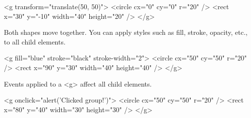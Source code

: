 \documentclass{report}
\begin{document}
\begin{itemize}
            \bigbreak \noindent 
            \begin{htmlcode}
                <g transform="translate(50, 50)">
                    <circle cx="0" cy="0" r="20" />
                    <rect x="30" y="-10" width="40" height="20" />
                </g>
            \end{htmlcode}
            \bigbreak \noindent 
            Both shapes move together. You can apply styles such as fill, stroke, opacity, etc., to all child elements.
            \bigbreak \noindent 
            \begin{htmlcode}
                <g fill="blue" stroke="black" stroke-width="2">
                    <circle cx="50" cy="50" r="20" />
                    <rect x="90" y="30" width="40" height="40" />
                </g>
            \end{htmlcode}
            \bigbreak \noindent 
            Events applied to a <g> affect all child elements.
            \bigbreak \noindent 
            \begin{htmlcode}
                <g onclick="alert('Clicked group!')">
                    <circle cx="50" cy="50" r="20" />
                    <rect x="80" y="40" width="30" height="30" />
                </g>
            \end{htmlcode}
    \end{itemize}

    \pagebreak 
\end{document}
